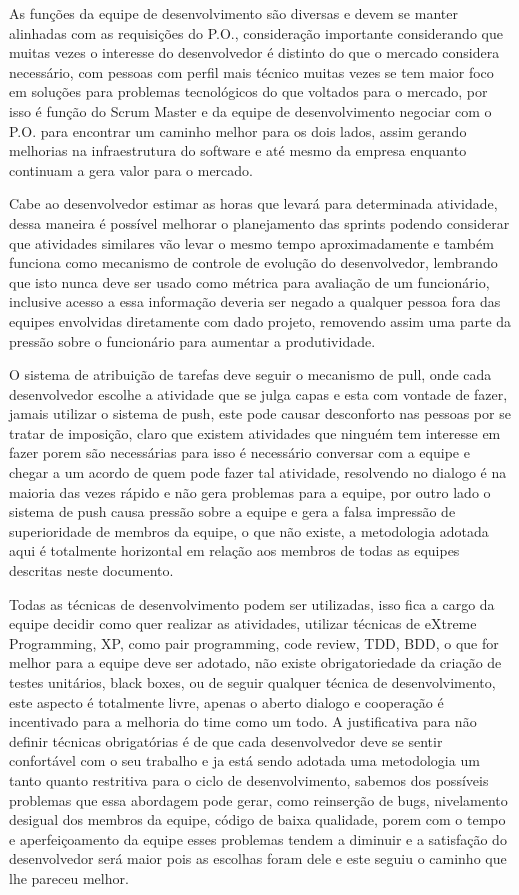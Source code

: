 \documentclass[
    article,            %
    11pt,               %
    oneside,            %
    a4paper,            %
    english,            %
    brazil,             %
    sumario=tradicional
    ]{abntex2}
\begin{document}
As funções da equipe de desenvolvimento são diversas e devem se manter alinhadas com as requisições do P.O., consideração importante considerando que muitas vezes o interesse do desenvolvedor é distinto do que o mercado considera necessário, com pessoas com perfil mais técnico
muitas vezes se tem maior foco em soluções para problemas tecnológicos do que voltados para o mercado, por isso é função do Scrum Master e da equipe de desenvolvimento negociar com o P.O. para encontrar um caminho melhor para os dois lados, assim gerando melhorias na infraestrutura
do software e até mesmo da empresa enquanto continuam a gera valor para o mercado.

Cabe ao desenvolvedor estimar as horas que levará para determinada atividade, dessa maneira é possível melhorar o planejamento das sprints podendo considerar que atividades similares vão levar o mesmo tempo aproximadamente e também funciona como mecanismo de controle de evolução
do desenvolvedor, lembrando que isto nunca deve ser usado como métrica para avaliação de um funcionário, inclusive acesso a essa informação deveria ser negado a qualquer pessoa fora das equipes envolvidas diretamente com dado projeto, removendo assim uma parte  da pressão 
sobre o funcionário para aumentar a produtividade.

O sistema de atribuição de tarefas deve seguir o mecanismo de pull, onde cada desenvolvedor escolhe a atividade que se julga capas e esta com vontade de fazer, jamais utilizar o sistema de push, este pode causar desconforto nas pessoas por se tratar de imposição, claro que existem atividades
que ninguém tem interesse em fazer porem são necessárias para isso é necessário conversar com a equipe e chegar a um acordo de quem pode fazer tal atividade, resolvendo no dialogo é na maioria das vezes rápido e não gera problemas para a equipe, por outro lado o sistema de push causa pressão
sobre a equipe e gera a falsa impressão de superioridade de membros da equipe, o que não existe, a metodologia adotada aqui é totalmente horizontal em relação aos membros de todas as equipes descritas neste documento.

Todas as técnicas de desenvolvimento podem ser utilizadas, isso fica a cargo da equipe decidir como quer realizar as atividades, utilizar técnicas de eXtreme Programming, XP, como pair programming, code review, TDD, BDD, o que for melhor para a equipe deve ser adotado, não existe obrigatoriedade
da criação de testes unitários, black boxes, ou de seguir qualquer técnica de desenvolvimento, este aspecto é totalmente livre, apenas o aberto dialogo e cooperação é incentivado para a melhoria do time como um todo. A justificativa para não definir técnicas obrigatórias é de que cada desenvolvedor deve
se sentir confortável com o seu trabalho e ja está sendo adotada uma metodologia um tanto quanto restritiva para o ciclo de desenvolvimento, sabemos dos possíveis problemas que essa abordagem pode gerar, como reinserção de bugs, nivelamento desigual dos membros da equipe, código de baixa qualidade, porem com o tempo e aperfeiçoamento da equipe esses problemas tendem a diminuir e a satisfação do desenvolvedor será maior pois as escolhas foram dele e este seguiu o caminho que lhe pareceu melhor.
\end{document}
